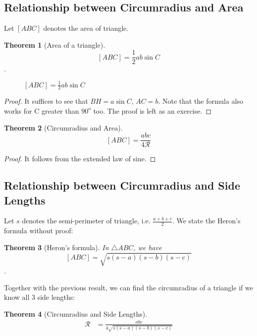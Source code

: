 \documentclass{article}
\newtheorem{theorem}{Theorem}
\theoremstyle{definition}
\begin{document}
\subsection{Relationship between Circumradius and Area}
Let $[ABC]$ denotes the area of triangle.
\begin{mdframed}
	\begin{theorem}[Area of a triangle]
		$$[ABC] = \dfrac{1}{2}ab\sin C$$.
	\end{theorem}
	\begin{figure}[H]
		\centering
		\caption{$[ABC] = \frac{1}{2}ab \sin C$}
	\end{figure}
\end{mdframed}
\begin{proof}
	It suffices to see that $BH = a\sin C$, $AC=b$. Note that the formula also works for C greater than $90^o$ too. The proof is left as an exercise.
\end{proof}
\begin{mdframed}
			\begin{theorem}[Circumradius and Area]
				$$[ABC] = \dfrac{abc}{4\mathcal{R}}$$
			\end{theorem}
\end{mdframed}
\begin{proof}
	It follows from the extended law of sine.	
\end{proof}
\subsection{Relationship between Circumradius and Side Lengths}
Let $s$ denotes the semi-perimeter of triangle, i.e. $\frac{a+b+c}{2}$.
We state the Heron's formula without proof:
\begin{mdframed}
	\begin{theorem}[Heron's formula]
		In $\triangle ABC$, we have $$[ABC] = \sqrt{s(s-a)(s-b)(s-c)}$$.
	\end{theorem}
\end{mdframed}
Together with the previous result, we can find the circumradius of a triangle if we know all $3$ side lengths:
\begin{mdframed}
	\begin{theorem}[Circumradius and Side Lengths]
		\begin{align*}
			\mathcal{R} &= \tfrac{abc}{4\sqrt{s(s-a)(s-b)(s-c)} }
		\end{align*}
	\end{theorem}
\end{mdframed}
\end{document}
